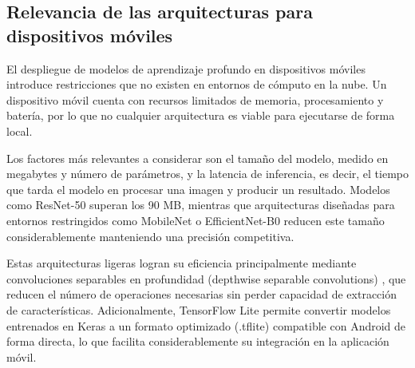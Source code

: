 \subsection{Relevancia de las arquitecturas para dispositivos móviles}

El despliegue de modelos de aprendizaje profundo en dispositivos móviles introduce restricciones que no existen en entornos de cómputo en la nube. Un dispositivo móvil cuenta con recursos limitados de memoria, procesamiento y batería, por lo que no cualquier arquitectura es viable para ejecutarse de forma local.

Los factores más relevantes a considerar son el tamaño del modelo, medido en megabytes y número de parámetros, y la latencia de inferencia, es decir, el tiempo que tarda el modelo en procesar una imagen y producir un resultado. Modelos como ResNet-50 superan los 90 MB, mientras que arquitecturas diseñadas para entornos restringidos como MobileNet o EfficientNet-B0 reducen este tamaño considerablemente manteniendo una precisión competitiva.

Estas arquitecturas ligeras logran su eficiencia principalmente mediante convoluciones separables en profundidad (depthwise separable convolutions) \cite{howard2017mobilenets}, que reducen el número de operaciones necesarias sin perder capacidad de extracción de características. Adicionalmente, TensorFlow Lite permite convertir modelos entrenados en Keras a un formato optimizado (.tflite) compatible con Android de forma directa, lo que facilita considerablemente su integración en la aplicación móvil.